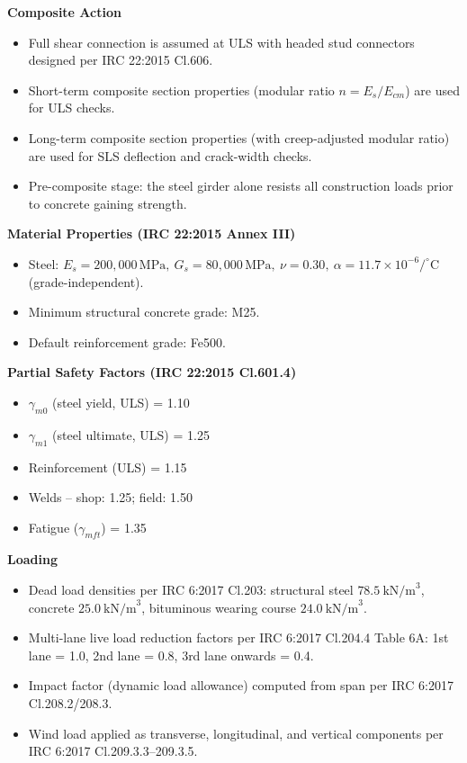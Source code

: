 \documentclass[12pt,a4paper]{report}
\numberwithin{table}{chapter}
\numberwithin{figure}{chapter}
\begin{document}
\textbf{Composite Action}

\begin{itemize}
    \item Full shear connection is assumed at ULS with headed stud connectors designed per IRC 22:2015 Cl.606.
    \item Short-term composite section properties (modular ratio $n = E_s/E_{cm}$) are used for ULS checks.
    \item Long-term composite section properties (with creep-adjusted modular ratio) are used for SLS deflection and crack-width checks.
    \item Pre-composite stage: the steel girder alone resists all construction loads prior to concrete gaining strength.
\end{itemize}


\textbf{Material Properties (IRC 22:2015 Annex III)}

\begin{itemize}
\item Steel: $E_s = 200{,}000 \, \text{MPa}, \ G_s = 80{,}000 \, \text{MPa}, \ \nu = 0.30, \ \alpha = 11.7 \times 10^{-6}/^\circ\mathrm{C}$ (grade-independent).
\item Minimum structural concrete grade: M25.
\item Default reinforcement grade: Fe500.
\end{itemize}

\textbf{Partial Safety Factors (IRC 22:2015 Cl.601.4)}

\begin{itemize}
\item $\gamma_{m0}$ (steel yield, ULS) = 1.10
\item $\gamma_{m1}$ (steel ultimate, ULS) = 1.25
\item Reinforcement (ULS) = 1.15
\item Welds -- shop: 1.25; field: 1.50
\item Fatigue ($\gamma_{mft}$) = 1.35
\end{itemize}

\textbf{Loading}

\begin{itemize}
\item Dead load densities per IRC 6:2017 Cl.203: structural steel $78.5 \ \text{kN/m}^3$, concrete $25.0 \ \text{kN/m}^3$, bituminous wearing course $24.0 \ \text{kN/m}^3$.
\item Multi-lane live load reduction factors per IRC 6:2017 Cl.204.4 Table 6A: 1st lane = 1.0, 2nd lane = 0.8, 3rd lane onwards = 0.4.
\item Impact factor (dynamic load allowance) computed from span per IRC 6:2017 Cl.208.2/208.3.
\item Wind load applied as transverse, longitudinal, and vertical components per IRC 6:2017 Cl.209.3.3--209.3.5.
\end{itemize}
\end{document}
